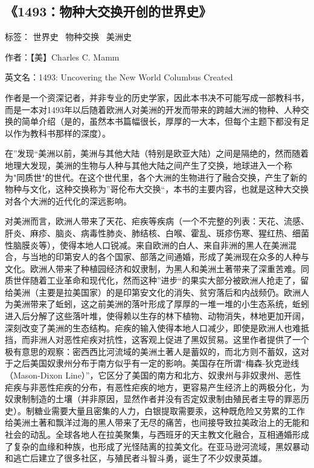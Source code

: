 \subsection{《1493：物种大交换开创的世界史》}

标签： 世界史 \ 物种交换 \  美洲史

作者：【美】Charles C. Mamm

英文名：1493: Uncovering the New World Columbus Created

作者是一个资深记者，并非专业的历史学家，因此本书决不可能写成一部教科书，而是一本对1493年以后随着欧洲人对美洲的开发而带来的跨越大洲的物种、人种交换的简单介绍（是的，虽然本书篇幅很长，厚厚的一大本，但每个主题下都没有足以作为教科书那样的深度）。

在”发现“美洲以前，美洲与其他大陆（特别是欧亚大陆）之间是隔绝的，然而随着地理大发现，美洲的生物与人种与其他大陆之间产生了交换，地球进入一个称为"同质世"的世代。在这个世代里，各个大洲的生物进行了融合交换，产生了新的物种与文化，这种交换称为”哥伦布大交换“，本书的主要内容，也就是这种大交换对各个大洲的近代化的深远影响。

对美洲而言，欧洲人带来了天花、疟疾等疾病（一个不完整的列表：天花、流感、肝炎、麻疹、脑炎、病毒性肺炎、肺结核、白喉、霍乱、斑疹伤寒、猩红热、细菌性脑膜炎等），使得本地人口锐减。来自欧洲的白人、来自非洲的黑人在美洲混合，与当地的印第安人的各个国家、部落之间通婚，形成了美洲现在众多的人种与文化。欧洲人带来了种植园经济和奴隶制，为黑人和美洲土著带来了深重苦难。同质世伴随着工业革命和现代化，然而这种”进步“的果实大部分被欧洲人抢走了，留给美洲（主要是拉美国家）的是印第安文化的消失、贫穷落后和内战频仍。欧洲人为美洲带来了蚯蚓，这之前美洲的落叶形成了厚厚的一堆一堆的小生态系统，蚯蚓进入后分解了这些落叶堆，使得赖以生存的林下植物、动物消失，林地更加开阔，深刻改变了美洲的生态结构。疟疾的输入使得本地人口减少，即使是欧洲人也难抵挡，而非洲人对恶性疟疾对抗性，这客观上促进了黑奴贸易。这里作者提供了一个极有意思的观察：密西西比河流域的美洲土著人是蓄奴的，而北方则不蓄奴，这对于之后美国奴隶州分布于南方似乎有一定的影响。美国存在所谓“梅森-狄克逊线（Mason-Dixon Line）”，它区分了美国的南方和北方、奴隶州与非奴隶州、恶性疟疾与非恶性疟疾的分布，有恶性疟疾的地方，更容易产生经济上的两极分化，为奴隶制制造的土壤（并非原因，显然作者并没有否定奴隶制由殖民者主导的罪恶历史）。制糖业需要大量且密集的人力，白银提取需要汞，这种既危险又劳累的工作给美洲土著和飘洋过海的黑人带来了无尽的痛苦，也间接导致拉美政治上的无能和社会的动乱。全球各地人在拉美聚集，与西班牙的天主教文化融合，互相通婚形成了复杂的血缘和种族，也形成了光怪陆离的拉美文化。在亚马逊河流域，黑奴暴动和逃亡后建立了很多社区，与殖民者斗智斗勇，诞生了不少奴隶英雄。

